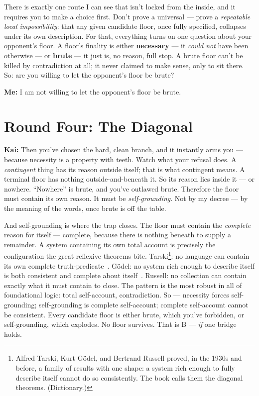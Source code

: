 \documentclass[fontsize=11pt,paper=a4,pagesize=auto,parskip=half-]{scrbook}
\newcommand{\speaker}[1]{\par\noindent\textbf{#1:}\hspace{0.6em}}
\begin{document}
There is exactly one route I can see that isn't locked from the inside, and it requires you to make a choice first. Don't prove a universal --- prove a \emph{repeatable local impossibility}: that any given candidate floor, once fully specified, collapses under its own description. For that, everything turns on one question about your opponent's floor. A floor's finality is either \textbf{necessary} --- it \emph{could not} have been otherwise --- or \textbf{brute} --- it just is, no reason, full stop. A brute floor can't be killed by contradiction at all; it never claimed to make sense, only to sit there. So: are you willing to let the opponent's floor be brute?

\speaker{Me} I am not willing to let the opponent's floor be brute.

\section{Round Four: The Diagonal}

\speaker{Kai} Then you've chosen the hard, clean branch, and it instantly arms you --- because necessity is a property with teeth. Watch what your refusal does. A \emph{contingent} thing has its reason outside itself; that is what contingent means. A terminal floor has nothing outside-and-beneath it. So its reason lies inside it --- or nowhere. ``Nowhere'' is brute, and you've outlawed brute. Therefore the floor must contain its own reason. It must be \emph{self-grounding}. Not by my decree --- by the meaning of the words, once brute is off the table.

And self-grounding is where the trap closes. The floor must contain the \emph{complete} reason for itself --- complete, because there is nothing beneath to supply a remainder. A system containing its own total account is precisely the configuration the great reflexive theorems bite. Tarski\footnote{Alfred Tarski, Kurt G\"odel, and Bertrand Russell proved, in the 1930s and before, a family of results with one shape: a system rich enough to fully describe itself cannot do so consistently. The book calls them the diagonal theorems. (Dictionary.)}: no language can contain its own complete truth-predicate~\cite{tarski1956}. Gödel: no system rich enough to describe itself is both consistent and complete about itself~\cite{goedel1931}. Russell: no collection can contain exactly what it must contain to close. The pattern is the most robust in all of foundational logic: total self-account, contradiction. So --- necessity forces self-grounding; self-grounding is complete self-account; complete self-account cannot be consistent. Every candidate floor is either brute, which you've forbidden, or self-grounding, which explodes. No floor survives. That is B --- \emph{if} one bridge holds.
\end{document}
